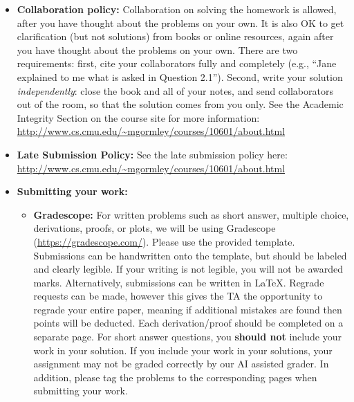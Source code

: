 \documentclass[12pt]{article}
\begin{document}
\begin{itemize}
\item \textbf{Collaboration policy:} Collaboration on solving the homework is allowed, after you have thought about the problems on your own. It is also OK to get clarification (but not solutions) from books or online resources, again after you have thought about the problems on your own. There are two requirements: first, cite your collaborators fully and completely (e.g., ``Jane explained to me what is asked in Question 2.1''). Second, write your solution {\em independently}: close the book and all of your notes, and send collaborators out of the room, so that the solution comes from you only.  See the Academic Integrity Section on the course site for more information: \url{http://www.cs.cmu.edu/~mgormley/courses/10601/about.html}

\item\textbf{Late Submission Policy:} See the late submission policy here: \url{http://www.cs.cmu.edu/~mgormley/courses/10601/about.html}

\item\textbf{Submitting your work:} 

\begin{itemize}

\item \textbf{Gradescope:} For written problems such as short answer, multiple choice, derivations, proofs, or plots, we will be using Gradescope (\url{https://gradescope.com/}). Please use the provided template. Submissions can be handwritten onto the template, but should be labeled and clearly legible. If your writing is not legible, you will not be awarded marks. Alternatively, submissions can be written in LaTeX. Regrade requests can be made, however this gives the TA the opportunity to regrade your entire paper, meaning if additional mistakes are found then points will be deducted.
Each derivation/proof should be completed on a separate page. For short answer questions, you \textbf{should not} include your work in your solution.  If you include your work in your solutions, your assignment may not be graded correctly by our AI assisted grader. In addition, please tag the problems to the corresponding pages when submitting your work.

\end{itemize}


\end{itemize}
\end{document}

